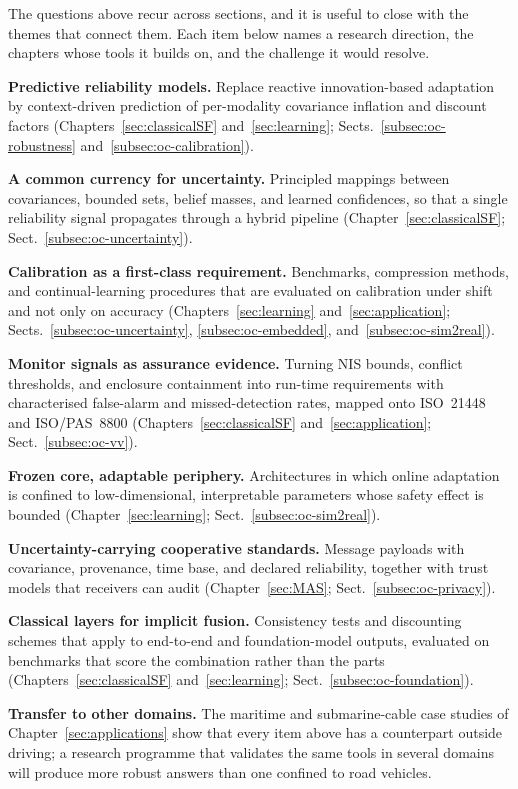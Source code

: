 The questions above recur across sections, and it is useful to close with the themes that connect them. Each item below names a research direction, the chapters whose tools it builds on, and the challenge it would resolve.
\begin{list4a}
    \item \textbf{Predictive reliability models.} Replace reactive innovation-based adaptation by context-driven prediction of per-modality covariance inflation and discount factors (Chapters~\ref{sec:classicalSF} and~\ref{sec:learning}; Sects.~\ref{subsec:oc-robustness} and~\ref{subsec:oc-calibration}).
    \item \textbf{A common currency for uncertainty.} Principled mappings between covariances, bounded sets, belief masses, and learned confidences, so that a single reliability signal propagates through a hybrid pipeline (Chapter~\ref{sec:classicalSF}; Sect.~\ref{subsec:oc-uncertainty}).
    \item \textbf{Calibration as a first-class requirement.} Benchmarks, compression methods, and continual-learning procedures that are evaluated on calibration under shift and not only on accuracy (Chapters~\ref{sec:learning} and~\ref{sec:application}; Sects.~\ref{subsec:oc-uncertainty}, \ref{subsec:oc-embedded}, and~\ref{subsec:oc-sim2real}).
    \item \textbf{Monitor signals as assurance evidence.} Turning NIS bounds, conflict thresholds, and enclosure containment into run-time requirements with characterised false-alarm and missed-detection rates, mapped onto ISO~21448 and ISO/PAS~8800 (Chapters~\ref{sec:classicalSF} and~\ref{sec:application}; Sect.~\ref{subsec:oc-vv}).
    \item \textbf{Frozen core, adaptable periphery.} Architectures in which online adaptation is confined to low-dimensional, interpretable parameters whose safety effect is bounded (Chapter~\ref{sec:learning}; Sect.~\ref{subsec:oc-sim2real}).
    \item \textbf{Uncertainty-carrying cooperative standards.} Message payloads with covariance, provenance, time base, and declared reliability, together with trust models that receivers can audit (Chapter~\ref{sec:MAS}; Sect.~\ref{subsec:oc-privacy}).
    \item \textbf{Classical layers for implicit fusion.} Consistency tests and discounting schemes that apply to end-to-end and foundation-model outputs, evaluated on benchmarks that score the combination rather than the parts (Chapters~\ref{sec:classicalSF} and~\ref{sec:learning}; Sect.~\ref{subsec:oc-foundation}).
    \item \textbf{Transfer to other domains.} The maritime and submarine-cable case studies of Chapter~\ref{sec:applications} show that every item above has a counterpart outside driving; a research programme that validates the same tools in several domains will produce more robust answers than one confined to road vehicles.
\end{list4a}

